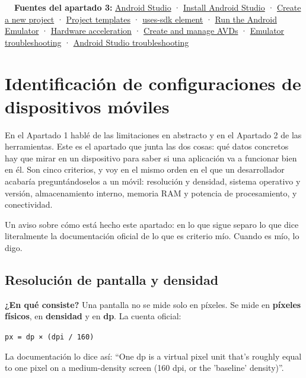 \documentclass[11pt,a4paper]{article}
\newcommand{\code}[1]{\texttt{\color{primary}#1}}
\newcommand{\campo}[1]{\textbf{\color{primary}#1}}
\begin{document}
	\begin{fuentesbox}
		\textbf{\color{muted}\faBook\ \ Fuentes del apartado 3:}
		\href{https://developer.android.com/studio}{Android Studio} ·
		\href{https://developer.android.com/studio/install}{Install Android Studio} ·
		\href{https://developer.android.com/studio/projects/create-project}{Create a new project} ·
		\href{https://developer.android.com/studio/projects/templates}{Project templates} ·
		\href{https://developer.android.com/guide/topics/manifest/uses-sdk-element}{uses-sdk element} ·
		\href{https://developer.android.com/studio/run/emulator}{Run the Android Emulator} ·
		\href{https://developer.android.com/studio/run/emulator-acceleration}{Hardware acceleration} ·
		\href{https://developer.android.com/studio/run/managing-avds}{Create and manage AVDs} ·
		\href{https://developer.android.com/studio/run/emulator-troubleshooting}{Emulator troubleshooting} ·
		\href{https://developer.android.com/studio/troubleshoot}{Android Studio troubleshooting}
	\end{fuentesbox}
	
	\newpage
	\section{Identificación de configuraciones de dispositivos móviles}
	
	En el Apartado 1 hablé de las limitaciones en abstracto y en el Apartado 2 de las herramientas. Este es el apartado que junta las dos cosas: qué datos concretos hay que mirar en un dispositivo para saber si una aplicación va a funcionar bien en él. Son cinco criterios, y voy en el mismo orden en el que un desarrollador acabaría preguntándoselos a un móvil: resolución y densidad, sistema operativo y versión, almacenamiento interno, memoria RAM y potencia de procesamiento, y conectividad.
	
	Un aviso sobre cómo está hecho este apartado: en lo que sigue separo lo que dice literalmente la documentación oficial de lo que es criterio mío. Cuando es mío, lo digo.
	
	\subsection{Resolución de pantalla y densidad}
	
	\campo{¿En qué consiste?}
	Una pantalla no se mide solo en píxeles. Se mide en \textbf{píxeles físicos}, en \textbf{densidad} y en \textbf{dp}. La cuenta oficial:
	\begin{center}\code{px = dp × (dpi / 160)}\end{center}
	La documentación lo dice así: \enquote{One dp is a virtual pixel unit that's roughly equal to one pixel on a medium-density screen (160 dpi, or the 'baseline' density)}.
	
\end{document}
